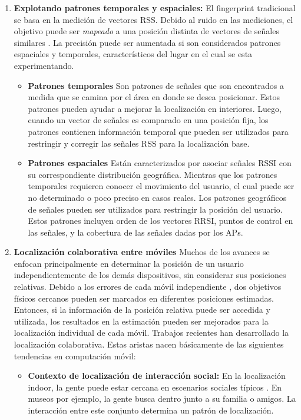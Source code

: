 \begin{enumerate}
\item \textbf{Explotando patrones temporales y espaciales:} El fingerprint tradicional se basa en la medición de vectores RSS. Debido al ruido en las mediciones, el objetivo puede ser \textit{mapeado} a una posición distinta de vectores de señales similares \citep{6681592}. La precisión puede ser aumentada si son considerados patrones espaciales y temporales, característicos del lugar en el cual se esta experimentando.

\begin{itemize}
\item \textbf{Patrones temporales} Son patrones de señales que son encontrados a medida que se camina por el área en donde se desea posicionar. Estos patrones pueden ayudar a mejorar la localización en interiores. Luego, cuando un vector de señales es comparado en una posición fija, los patrones contienen información temporal que pueden ser utilizados para restringir y corregir las señales RSS para la localización base.

\item \textbf{Patrones espaciales} Están caracterizados por asociar señales RSSI con su correspondiente distribución geográfica. Mientras que los patrones temporales requieren conocer el movimiento del usuario, el cual puede ser no determinado o poco preciso en casos reales. Los patrones geográficos de señales pueden ser utilizados para restringir la posición del usuario. Estos patrones incluyen orden de los vectores RRSI, puntos de control en las señales, y la cobertura de las señales dadas por los APs.

\end{itemize}

\item \textbf{Localización colaborativa entre móviles} Muchos de los avances se enfocan principalmente en determinar la posición de un usuario independientemente de los demás dispositivos, sin considerar sus posiciones relativas. Debido a los errores de cada móvil independiente , dos objetivos físicos cercanos pueden ser marcados en diferentes posiciones estimadas. Entonces, si la información de la posición relativa puede ser accedida y utilizada, los resultados en la estimación pueden ser mejorados para la localización individual de cada móvil. Trabajos recientes han desarrollado la localización colaborativa. Estas aristas nacen básicamente de las siguientes tendencias en computación móvil:

\begin{itemize}
\item \textbf{Contexto de localización de interacción social:} En la localización indoor, la gente puede estar cercana en escenarios sociales típicos \citep{Chan2006}. En museos por ejemplo, la gente busca dentro junto a su familia o amigos. La interacción entre este conjunto determina un patrón de localización.


\end{itemize}
\end{enumerate}

